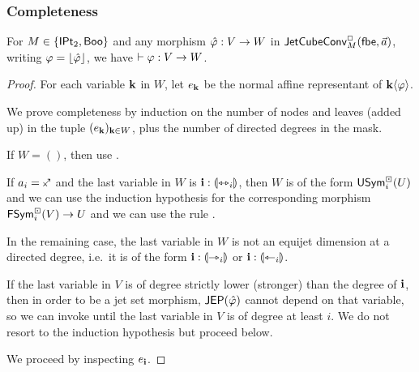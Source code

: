 \documentclass[a4paper]{memoir}
\begin{document}
\subsubsection{Completeness} \label{sec:jetcubes:calculus:completeness}
\begin{theorem}[Completeness] \label{thm:calculus-complete}
	For $M \in \mathopen{}\left\{ {\mathsf{IPt}_2}, \mathsf{Boo} \right\}\mathclose{}$ and any morphism $\hat {\varphi} : V \to W$ in $\mathsf{JetCubeConv}^{\Box}_{M}\mathopen{}\left( {\mathsf{fbe}},\vec a \right)\mathclose{}$, writing $\varphi = \mathopen{}\left\lfloor \hat {\varphi} \right\rfloor\mathclose{}$, we have $\vdash \varphi : V \to W$.
\end{theorem}
\begin{proof}
	For each variable $\mathbf{k}$ in $W$, let $e_{\mathbf{k}}$ be the normal affine representant of $\mathbf{k} \langle \varphi \rangle$.

	We prove completeness by induction on the number of nodes and leaves (added up) in the tuple $(e_{\mathbf{k}})_{\mathbf{k} \in W}$, plus the number of directed degrees in the mask.
	
	If $W = ()$, then use .
	
	If $a_i = \ypolar$ and the last variable in $W$ is $\mathbf{i} : {\llparenthesis \leftrightarrowtriangle_i \rrparenthesis}$, then $W$ is of the form $\mathsf{USym}^\boxdot_i(U)$ and we can use the induction hypothesis for the corresponding morphism $\mathsf{FSym}^\boxdot_i(V) \to U$ and we can use the rule .
	
	In the remaining case, the last variable in $W$ is not an equijet dimension at a directed degree, i.e.\ it is of the form $\mathbf{i} : {\llparenthesis \rightarrowtriangle_i \rrparenthesis}$ or $\mathbf{i} : {\llparenthesis \leftarrowtriangle_i \rrparenthesis}$.
	
	If the last variable in $V$ is of degree strictly lower (stronger) than the degree of $\mathbf{i}$, then in order to be a jet set morphism, $\mathsf{JEP}(\hat {\varphi})$ cannot depend on that variable, so we can invoke  until the last variable in $V$ is of degree at least $i$. We do not resort to the induction hypothesis but proceed below.
	
	
	We proceed by inspecting $e_{\mathbf{i}}$.
	

\end{proof}
\end{document}
